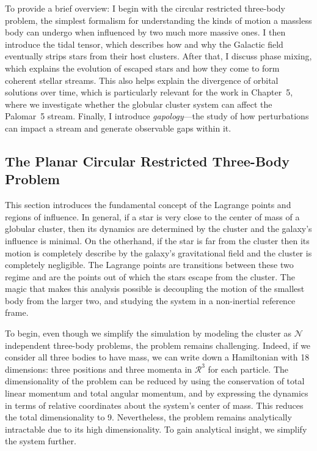     To provide a brief overview: I begin with the circular restricted three-body problem, the simplest formalism for understanding the kinds of motion a massless body can undergo when influenced by two much more massive ones. I then introduce the tidal tensor, which describes how and why the Galactic field eventually strips stars from their host clusters. After that, I discuss phase mixing, which explains the evolution of escaped stars and how they come to form coherent stellar streams. This also helps explain the divergence of orbital solutions over time, which is particularly relevant for the work in Chapter~5, where we investigate whether the globular cluster system can affect the Palomar~5 stream. Finally, I introduce \textit{gapology}—the study of how perturbations can impact a stream and generate observable gaps within it.

    
    \subsection{The Planar Circular Restricted Three-Body Problem}
        
        This section introduces the fundamental concept of the Lagrange points and regions of influence. In general, if a star is very close to the center of mass of a globular cluster, then its dynamics are determined by the cluster and the galaxy's influence is minimal. On the otherhand, if the star is far from the cluster then its motion is completely describe by the galaxy's gravitational field and the cluster is completely negligible. The Lagrange points are transitions between these two regime and are the points out of which the stars escape from the cluster. The magic that makes this analysis possible is decoupling the motion of the smallest body from the larger two, and studying the system in a non-inertial reference frame. 

        To begin, even though we simplify the simulation by modeling the cluster as $\mathcal{N}$ independent three-body problems, the problem remains challenging. Indeed, if we consider all three bodies to have mass, we can write down a Hamiltonian with 18 dimensions: three positions and three momenta in $\mathcal{R}^3$ for each particle. The dimensionality of the problem can be reduced by using the conservation of total linear momentum and total angular momentum, and by expressing the dynamics in terms of relative coordinates about the system's center of mass. This reduces the total dimensionality to 9. Nevertheless, the problem remains analytically intractable due to its high dimensionality. To gain analytical insight, we simplify the system further.
        
